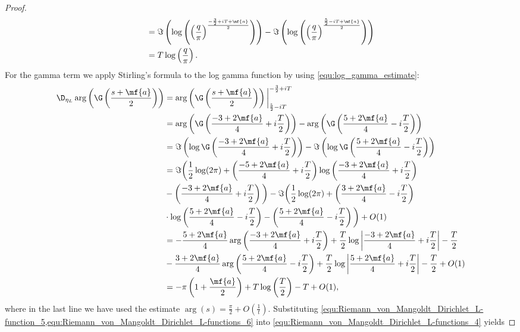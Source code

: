 \begin{proof}
\begin{equation}
\begin{aligned}
            &= \Im\left(\log\left(\left(\frac{q}{\pi}\right)^{\frac{-\frac{3}{2}+iT+\mf{a}}{2}}\right)\right)-\Im\left(\log\left(\left(\frac{q}{\pi}\right)^{\frac{\frac{5}{2}-iT+\mf{a}}{2}}\right)\right) \\
            &= T\log\left(\frac{q}{\pi}\right).
          \end{aligned}            
        \end{equation}
        For the gamma term we apply Stirling's formula to the log gamma function by using \cref{equ:log_gamma_estimate}:
        \begin{equation}\label{equ:Riemann_von_Mangoldt_Dirichlet_L-functions_6}
          \begin{aligned}
            \D_{\eta_{L}}\arg\left(\G\left(\frac{s+\mf{a}}{2}\right)\right) &= \arg\left(\G\left(\frac{s+\mf{a}}{2}\right)\right)\bigg|_{\frac{5}{2}-iT}^{-\frac{3}{2}+iT} \\
            &= \arg\left(\G\left(\frac{-3+2\mf{a}}{4}+i\frac{T}{2}\right)\right)-\arg\left(\G\left(\frac{5+2\mf{a}}{4}-i\frac{T}{2}\right)\right) \\
            &= \Im\left(\log\G\left(\frac{-3+2\mf{a}}{4}+i\frac{T}{2}\right)\right)-\Im\left(\log\G\left(\frac{5+2\mf{a}}{4}-i\frac{T}{2}\right)\right) \\
            &= \Im\bigg(\frac{1}{2}\log(2\pi)+\left(\frac{-5+2\mf{a}}{4}+i\frac{T}{2}\right)\log\left(\frac{-3+2\mf{a}}{4}+i\frac{T}{2}\right) \\
            &- \left(\frac{-3+2\mf{a}}{4}+i\frac{T}{2}\right)\bigg)-\Im\bigg(\frac{1}{2}\log(2\pi)+\left(\frac{3+2\mf{a}}{4}-i\frac{T}{2}\right) \\
            &\cdot \log\left(\frac{5+2\mf{a}}{4}-i\frac{T}{2}\right)-\left(\frac{5+2\mf{a}}{4}-i\frac{T}{2}\right)\bigg)+O(1) \\
            &= -\frac{5+2\mf{a}}{4}\arg\left(\frac{-3+2\mf{a}}{4}+i\frac{T}{2}\right)+\frac{T}{2}\log\left|\frac{-3+2\mf{a}}{4}+i\frac{T}{2}\right|-\frac{T}{2} \\
            &- \frac{3+2\mf{a}}{4}\arg\left(\frac{5+2\mf{a}}{4}-i\frac{T}{2}\right)+\frac{T}{2}\log\left|\frac{5+2\mf{a}}{4}+i\frac{T}{2}\right|-\frac{T}{2}+O(1) \\
            &= -\pi\left(1+\frac{\mf{a}}{2}\right)+T\log\left(\frac{T}{2}\right)-T+O(1),
          \end{aligned}
        \end{equation}
        where in the last line we have used the estimate $\arg(s) = \frac{\pi}{2}+O\left(\frac{1}{t}\right)$. Substituting \cref{equ:Riemann_von_Mangoldt_Dirichlet_L-function_5,equ:Riemann_von_Mangoldt_Dirichlet_L-functions_6} into \cref{equ:Riemann_von_Mangoldt_Dirichlet_L-functions_4} yields

\end{proof}

